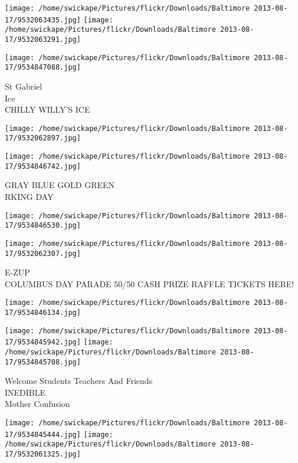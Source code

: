 \documentclass[10pt,letterpaper]{article}
\begin{document}
\texttt{[image: /home/swickape/Pictures/flickr/Downloads/Baltimore 2013-08-17/9532063435.jpg]}
\texttt{[image: /home/swickape/Pictures/flickr/Downloads/Baltimore 2013-08-17/9532063291.jpg]}

\texttt{[image: /home/swickape/Pictures/flickr/Downloads/Baltimore 2013-08-17/9534847088.jpg]}

St Gabriel\\
Ice\\
CHILLY WILLY'S ICE\\
\pagebreak

\texttt{[image: /home/swickape/Pictures/flickr/Downloads/Baltimore 2013-08-17/9532062897.jpg]}

\vspace{0.25in}
\texttt{[image: /home/swickape/Pictures/flickr/Downloads/Baltimore 2013-08-17/9534846742.jpg]}

GRAY BLUE GOLD GREEN\\
RKING DAY\\
\pagebreak

\texttt{[image: /home/swickape/Pictures/flickr/Downloads/Baltimore 2013-08-17/9534846530.jpg]}

\vspace{0.25in}
\texttt{[image: /home/swickape/Pictures/flickr/Downloads/Baltimore 2013-08-17/9532062307.jpg]}

E{-}ZUP\\
COLUMBUS DAY PARADE 50/50 CASH PRIZE RAFFLE TICKETS HERE!\\
\pagebreak

\texttt{[image: /home/swickape/Pictures/flickr/Downloads/Baltimore 2013-08-17/9534846134.jpg]}

\vspace{0.25in}
\texttt{[image: /home/swickape/Pictures/flickr/Downloads/Baltimore 2013-08-17/9534845942.jpg]}
\texttt{[image: /home/swickape/Pictures/flickr/Downloads/Baltimore 2013-08-17/9534845708.jpg]}

Welcome Students Teachers And Friends\\
INEDIBLE\\
Mother Confusion\\
\pagebreak

\texttt{[image: /home/swickape/Pictures/flickr/Downloads/Baltimore 2013-08-17/9534845444.jpg]}
\texttt{[image: /home/swickape/Pictures/flickr/Downloads/Baltimore 2013-08-17/9532061325.jpg]}
\end{document}
